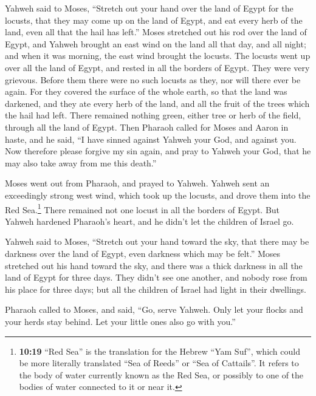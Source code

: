  Yahweh said to Moses, ``Stretch out your hand over the
land of Egypt for the locusts, that they may come up on the land of
Egypt, and eat every herb of the land, even all that the hail has
left.''  Moses stretched out his rod over the land of
Egypt, and Yahweh brought an east wind on the land all that day, and all
night; and when it was morning, the east wind brought the locusts.
 The locusts went up over all the land of Egypt, and
rested in all the borders of Egypt. They were very grievous. Before them
there were no such locusts as they, nor will there ever be again.
 For they covered the surface of the whole earth, so that
the land was darkened, and they ate every herb of the land, and all the
fruit of the trees which the hail had left. There remained nothing
green, either tree or herb of the field, through all the land of Egypt.
 Then Pharaoh called for Moses and Aaron in haste, and he
said, ``I have sinned against Yahweh your God, and against you.
 Now therefore please forgive my sin again, and pray to
Yahweh your God, that he may also take away from me this death.''

 Moses went out from Pharaoh, and prayed to Yahweh.
 Yahweh sent an exceedingly strong west wind, which took
up the locusts, and drove them into the Red Sea.\footnote{\textbf{10:19}
  ``Red Sea'' is the translation for the Hebrew ``Yam Suf'', which could
  be more literally translated ``Sea of Reeds'' or ``Sea of Cattails''.
  It refers to the body of water currently known as the Red Sea, or
  possibly to one of the bodies of water connected to it or near it.}
There remained not one locust in all the borders of Egypt.
 But Yahweh hardened Pharaoh's heart, and he didn't let
the children of Israel go.

 Yahweh said to Moses, ``Stretch out your hand toward the
sky, that there may be darkness over the land of Egypt, even darkness
which may be felt.''  Moses stretched out his hand toward
the sky, and there was a thick darkness in all the land of Egypt for
three days.  They didn't see one another, and nobody rose
from his place for three days; but all the children of Israel had light
in their dwellings.

 Pharaoh called to Moses, and said, ``Go, serve Yahweh.
Only let your flocks and your herds stay behind. Let your little ones
also go with you.''

